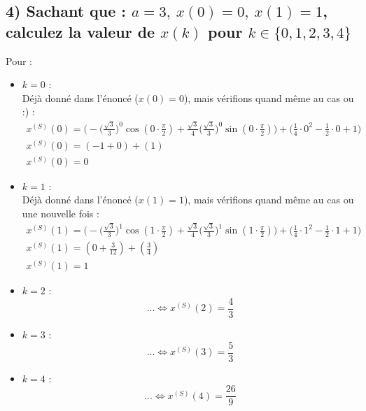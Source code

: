 \documentclass[11pt,a4paper]{report}
\begin{document}
		\subsection*{4) Sachant que : $a=3,\ x(0) = 0,\ x(1) = 1$, calculez la valeur de $x(k)$ pour $k \in \{ 0,1,2,3,4 \}$}
			Pour :
			\begin{itemize}
			\item $k = 0$ : \\
				Déjà donné dans l'énoncé ($x(0) = 0$), mais vérifions quand même au cas ou :) :
				\begin{gather*}
					x^{(S)}(0) = \Big( -\Big(\frac{\sqrt{3}}{3} \Big)^0 \cos(0 \cdot \frac{\pi}{2}) + \frac{\sqrt{3}}{4} \Big(\frac{\sqrt{3}}{3}\Big)^0 \sin(0 \cdot \frac{\pi}{2})\Big) + \Big(\frac{1}{4} \cdot 0^2 - \frac{1}{2} \cdot 0 + 1 \Big) \\
					x^{(S)}(0) = (-1 + 0) + (1)\\
					x^{(S)}(0) = 0
				\end{gather*}
			
			\item $k = 1$ : \\
				Déjà donné dans l'énoncé ($x(1) = 1$), mais vérifions quand même au cas ou une nouvelle fois :
				\begin{gather*}
					x^{(S)}(1) = \Big( -\Big(\frac{\sqrt{3}}{3} \Big)^1 \cos(1 \cdot \frac{\pi}{2}) + \frac{\sqrt{3}}{4} \Big(\frac{\sqrt{3}}{3}\Big)^1 \sin(1 \cdot \frac{\pi}{2})\Big) + \Big(\frac{1}{4} \cdot 1^2 - \frac{1}{2} \cdot 1 + 1 \Big) \\
					x^{(S)}(1) = (0 + \frac{3}{12}) + (\frac{3}{4})\\
					x^{(S)}(1) = 1
				\end{gather*}
				
			\item $k = 2$ :\\
				\[ 
					... \Leftrightarrow x^{(S)}(2) = \frac{4}{3} 
				\]
			
			\item $k = 3$ :\\
				\[
					... \Leftrightarrow x^{(S)}(3) = \frac{5}{3}
				\]
			
			\item $k = 4$ :\\
				\[
					... \Leftrightarrow x^{(S)}(4) = \frac{26}{9}
				\]
			\end{itemize}						
	
	
		
		
	\pagebreak
\end{document}
